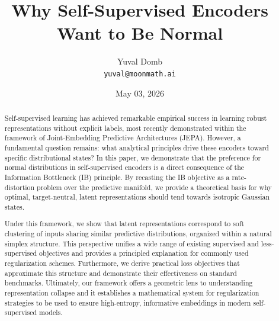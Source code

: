 \documentclass[11pt]{article}
\title{Why Self-Supervised Encoders Want to Be Normal}
\author{Yuval Domb\\\texttt{yuval@moonmath.ai}}
\date{May 03, 2026}
\begin{document}
\maketitle

\begin{abstract}
Self-supervised learning has achieved remarkable empirical success in learning robust representations without explicit labels, most recently demonstrated within the framework of Joint-Embedding Predictive Architectures (JEPA).
However, a fundamental question remains: what analytical principles drive these encoders toward specific distributional states? In this paper, we demonstrate that the preference for normal distributions in self-supervised encoders is a direct consequence of the Information Bottleneck (IB) principle. By recasting the IB objective as a rate-distortion problem over the predictive manifold, we provide a theoretical basis for why optimal, target-neutral, latent representations should tend towards isotropic Gaussian states.

Under this framework, we show that latent representations correspond to soft clustering of inputs sharing similar predictive distributions, organized within a natural simplex structure. This perspective unifies a wide range of existing supervised and less-supervised objectives and provides a principled explanation for commonly used regularization schemes. Furthermore, we derive practical loss objectives that approximate this structure and demonstrate their effectiveness on standard benchmarks. Ultimately, our framework offers a geometric lens to understanding representation collapse and it establishes a mathematical system for regularization strategies to be used to ensure high-entropy, informative embeddings in modern self-supervised models.




\end{abstract}
\end{document}
